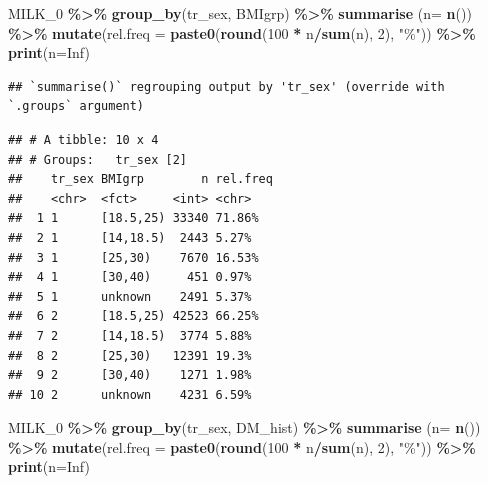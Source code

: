 \documentclass[
]{article}
\newenvironment{Shaded}{\begin{snugshade}}{\end{snugshade}}
\newcommand{\DataTypeTok}[1]{\textcolor[rgb]{0.13,0.29,0.53}{#1}}
\newcommand{\DecValTok}[1]{\textcolor[rgb]{0.00,0.00,0.81}{#1}}
\newcommand{\KeywordTok}[1]{\textcolor[rgb]{0.13,0.29,0.53}{\textbf{#1}}}
\newcommand{\NormalTok}[1]{#1}
\newcommand{\OperatorTok}[1]{\textcolor[rgb]{0.81,0.36,0.00}{\textbf{#1}}}
\newcommand{\OtherTok}[1]{\textcolor[rgb]{0.56,0.35,0.01}{#1}}
\newcommand{\StringTok}[1]{\textcolor[rgb]{0.31,0.60,0.02}{#1}}
\begin{document}
\begin{Shaded}
\begin{Highlighting}[]
\NormalTok{MILK\_}\DecValTok{0} \OperatorTok{\%\textgreater{}\%}\StringTok{ }
\StringTok{  }\KeywordTok{group\_by}\NormalTok{(tr\_sex, BMIgrp) }\OperatorTok{\%\textgreater{}\%}\StringTok{ }
\StringTok{  }\KeywordTok{summarise}\NormalTok{ (}\DataTypeTok{n=} \KeywordTok{n}\NormalTok{()) }\OperatorTok{\%\textgreater{}\%}
\StringTok{  }\KeywordTok{mutate}\NormalTok{(}\DataTypeTok{rel.freq =} \KeywordTok{paste0}\NormalTok{(}\KeywordTok{round}\NormalTok{(}\DecValTok{100} \OperatorTok{*}\StringTok{ }\NormalTok{n}\OperatorTok{/}\KeywordTok{sum}\NormalTok{(n), }\DecValTok{2}\NormalTok{), }\StringTok{"\%"}\NormalTok{))  }\OperatorTok{\%\textgreater{}\%}\StringTok{ }
\StringTok{  }\KeywordTok{print}\NormalTok{(}\DataTypeTok{n=}\OtherTok{Inf}\NormalTok{)}
\end{Highlighting}
\end{Shaded}

\begin{verbatim}
## `summarise()` regrouping output by 'tr_sex' (override with `.groups` argument)
\end{verbatim}

\begin{verbatim}
## # A tibble: 10 x 4
## # Groups:   tr_sex [2]
##    tr_sex BMIgrp        n rel.freq
##    <chr>  <fct>     <int> <chr>   
##  1 1      [18.5,25) 33340 71.86%  
##  2 1      [14,18.5)  2443 5.27%   
##  3 1      [25,30)    7670 16.53%  
##  4 1      [30,40)     451 0.97%   
##  5 1      unknown    2491 5.37%   
##  6 2      [18.5,25) 42523 66.25%  
##  7 2      [14,18.5)  3774 5.88%   
##  8 2      [25,30)   12391 19.3%   
##  9 2      [30,40)    1271 1.98%   
## 10 2      unknown    4231 6.59%
\end{verbatim}

\begin{Shaded}
\begin{Highlighting}[]
\NormalTok{MILK\_}\DecValTok{0} \OperatorTok{\%\textgreater{}\%}\StringTok{ }
\StringTok{  }\KeywordTok{group\_by}\NormalTok{(tr\_sex, DM\_hist) }\OperatorTok{\%\textgreater{}\%}\StringTok{ }
\StringTok{  }\KeywordTok{summarise}\NormalTok{ (}\DataTypeTok{n=} \KeywordTok{n}\NormalTok{()) }\OperatorTok{\%\textgreater{}\%}
\StringTok{  }\KeywordTok{mutate}\NormalTok{(}\DataTypeTok{rel.freq =} \KeywordTok{paste0}\NormalTok{(}\KeywordTok{round}\NormalTok{(}\DecValTok{100} \OperatorTok{*}\StringTok{ }\NormalTok{n}\OperatorTok{/}\KeywordTok{sum}\NormalTok{(n), }\DecValTok{2}\NormalTok{), }\StringTok{"\%"}\NormalTok{))  }\OperatorTok{\%\textgreater{}\%}\StringTok{ }
\StringTok{  }\KeywordTok{print}\NormalTok{(}\DataTypeTok{n=}\OtherTok{Inf}\NormalTok{)}
\end{Highlighting}
\end{Shaded}
\end{document}

